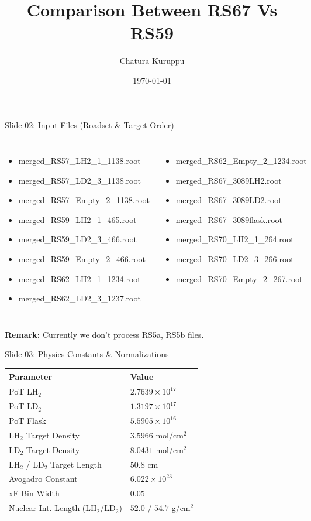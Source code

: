 \documentclass[aspectratio=169]{beamer}
\title{Comparison Between RS67 Vs RS59}
\author{Chatura Kuruppu}
\date{\today}
\begin{document}
\begin{frame}
\titlepage
\end{frame}
\begin{frame}{Slide 02: Input Files (Roadset \& Target Order)}
\begin{columns}
\tiny\begin{itemize}
\item merged\_RS57\_LH2\_1\_1138.root
\item merged\_RS57\_LD2\_3\_1138.root
\item merged\_RS57\_Empty\_2\_1138.root
\item merged\_RS59\_LH2\_1\_465.root
\item merged\_RS59\_LD2\_3\_466.root
\item merged\_RS59\_Empty\_2\_466.root
\item merged\_RS62\_LH2\_1\_1234.root
\item merged\_RS62\_LD2\_3\_1237.root
\end{itemize}\tiny\begin{itemize}
\item merged\_RS62\_Empty\_2\_1234.root
\item merged\_RS67\_3089LH2.root
\item merged\_RS67\_3089LD2.root
\item merged\_RS67\_3089flask.root
\item merged\_RS70\_LH2\_1\_264.root
\item merged\_RS70\_LD2\_3\_266.root
\item merged\_RS70\_Empty\_2\_267.root
\end{itemize}\end{columns}
\vspace{0.3cm}\centering\small\textbf{Remark:} Currently we don't process RS5a, RS5b files.
\end{frame}
\begin{frame}{Slide 03: Physics Constants \& Normalizations}
\centering\footnotesize
\begin{tabular}{ll}
\toprule \textbf{Parameter} & \textbf{Value} \\ \midrule
PoT LH$_2$ & $2.7639 \times 10^{17}$ \\
PoT LD$_2$ & $1.3197 \times 10^{17}$ \\
PoT Flask & $5.5905 \times 10^{16}$ \\
LH$_2$ Target Density & $3.5966$ mol/cm$^2$ \\
LD$_2$ Target Density & $8.0431$ mol/cm$^2$ \\
LH$_2$ / LD$_2$ Target Length & $50.8$ cm \\
Avogadro Constant & $6.022 \times 10^{23}$ \\
xF Bin Width & $0.05$ \\
Nuclear Int. Length (LH$_2$/LD$_2$) & $52.0$ / $54.7$ g/cm$^2$ \\
\bottomrule \end{tabular}
\end{frame}
\end{document}
